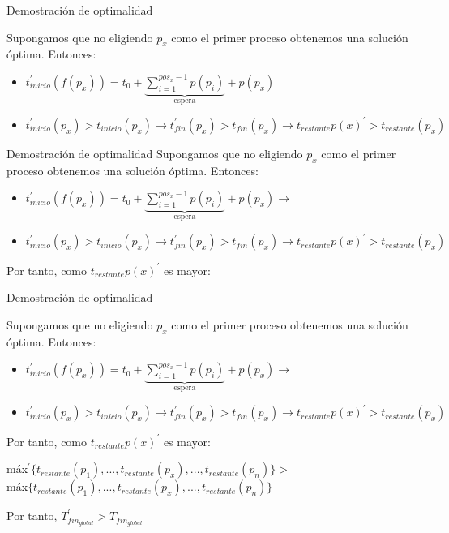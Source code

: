 \documentclass{beamer}
\begin{document}
\begin{frame}[fragile]{Demostración de optimalidad}

Supongamos que no eligiendo $p_x$ como el primer proceso obtenemos una solución óptima. Entonces:
\begin{itemize}
\item $t_{inicio}^{\prime}(f(p_x))= t_0 + 
\underbrace{\sum^{pos_x-1}_{i=1} p(p_i)}_{\text{espera}} + p(p_x) $

\item $t_{inicio}^{\prime}(p_x) > t_{inicio}(p_x) \rightarrow 
	t_{fin}^{\prime}(p_x) > t_{fin}(p_x) \rightarrow t_{restante}p(x)^{\prime} > t_{restante}(p_x)$
\end{itemize}

\end{frame}

\begin{frame}[fragile]{Demostración de optimalidad}
Supongamos que no eligiendo $p_x$ como el primer proceso obtenemos una solución óptima. Entonces:
\begin{itemize}
\item $t_{inicio}^{\prime}(f(p_x))= t_0 + 
\underbrace{\sum^{pos_x-1}_{i=1} p(p_i)}_{\text{espera}} + p(p_x) \rightarrow $

\item $t_{inicio}^{\prime}(p_x) > t_{inicio}(p_x) \rightarrow 
	t_{fin}^{\prime}(p_x) > t_{fin}(p_x) \rightarrow t_{restante}p(x)^{\prime} > t_{restante}(p_x)$
\end{itemize}

Por tanto, como $t_{restante}p(x)^{\prime}$ es mayor:
\end{frame}

\begin{frame}[fragile]{Demostración de optimalidad}

Supongamos que no eligiendo $p_x$ como el primer proceso obtenemos una solución óptima. Entonces:
\begin{itemize}
\item $t_{inicio}^{\prime}(f(p_x))= t_0 + 
\underbrace{\sum^{pos_x-1}_{i=1} p(p_i)}_{\text{espera}} + p(p_x) \rightarrow $

\item $t_{inicio}^{\prime}(p_x) > t_{inicio}(p_x) \rightarrow 
	t_{fin}^{\prime}(p_x) > t_{fin}(p_x) \rightarrow t_{restante}p(x)^{\prime} > t_{restante}(p_x)$
\end{itemize}

Por tanto, como $t_{restante}p(x)^{\prime}$ es mayor:
\begin{center}
máx$^{\prime}\{t_{restante}(p_1),...,t_{restante}(p_x),...,t_{restante}(p_n)\} > $ \\máx$\{t_{restante}(p_1),...,t_{restante}(p_x),...,t_{restante}(p_n)\}$
\end{center}
Por tanto, $T_{fin_{global}}^{\prime}> T_{fin_{global}}  $
\end{frame}
\end{document}
